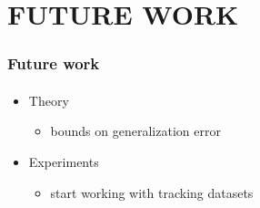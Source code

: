 \section{FUTURE WORK}
\begin{frame}
\frametitle{Future work}
\framesubtitle{}
\logoCSIPCPL\mypagenum
	\begin{itemize}
		\item Theory
			\begin{itemize}		
				\item bounds on generalization error
			\end{itemize}
		\item Experiments
			\begin{itemize}
				\item start working with tracking datasets
			\end{itemize}
	\end{itemize}
\end{frame}




\printbibliography





